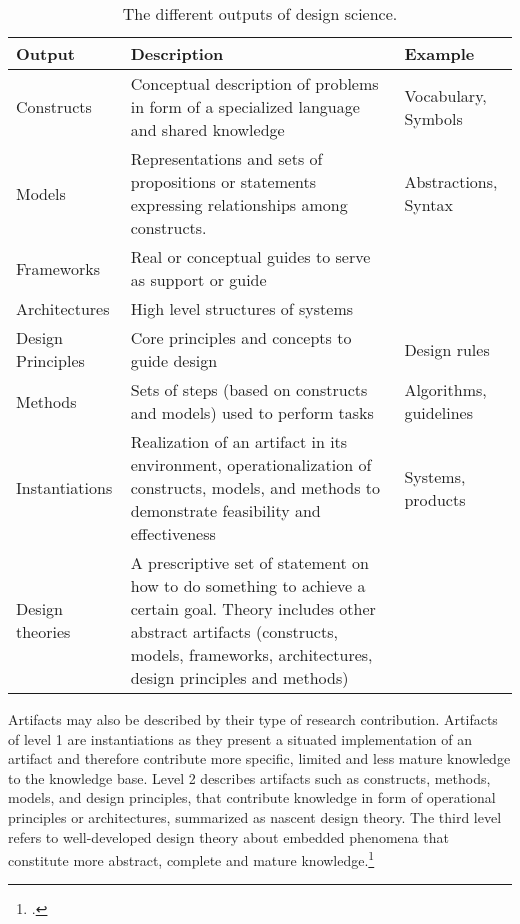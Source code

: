 \begin{table}
\setlength\extrarowheight{2pt} %
  \centering
  \begin{tabularx}{\textwidth}{|l|X|l|}
    \hline
        \textbf{Output} & \textbf{Description} & \textbf{Example}  \\ \hline\hline
        Constructs & Conceptual description of problems in form of a specialized language and shared knowledge & Vocabulary, Symbols \\
        Models & Representations and sets of propositions or statements expressing relationships among constructs. & Abstractions, Syntax \\
        Frameworks & Real or conceptual guides to serve as support or guide & \\
        Architectures & High level structures of systems & \\ 
        Design Principles & Core principles and concepts to guide design & Design rules \\
        Methods & Sets of steps (based on constructs and models) used to perform tasks & Algorithms, guidelines \\
        Instantiations & Realization of an artifact in its environment, operationalization of constructs, models, and methods to demonstrate feasibility and effectiveness & Systems, products \\
        Design theories & A prescriptive set of statement on how to do something to achieve a certain goal. Theory includes other abstract artifacts (constructs, models, frameworks, architectures, design principles and methods) & \\ \hline
    \end{tabularx}
    \caption[The different outputs of design science.]{The different outputs of design science.\footnotemark }
    \label{tab:Artifacts}
\end{table}

Artifacts may also be described by their type of research contribution. Artifacts of level 1 are instantiations as they present a situated implementation of an artifact and therefore contribute more specific, limited and less mature knowledge to the knowledge base. Level 2 describes artifacts such as constructs, methods, models, and design principles, that contribute knowledge in form of operational principles or architectures, summarized as nascent design theory. The third level refers to well-developed design theory about embedded phenomena that constitute more abstract, complete and mature knowledge.\footcite[Cf.][p.340]{GregorPositioningpresentingdesign2013} \label{topic:levels} 

